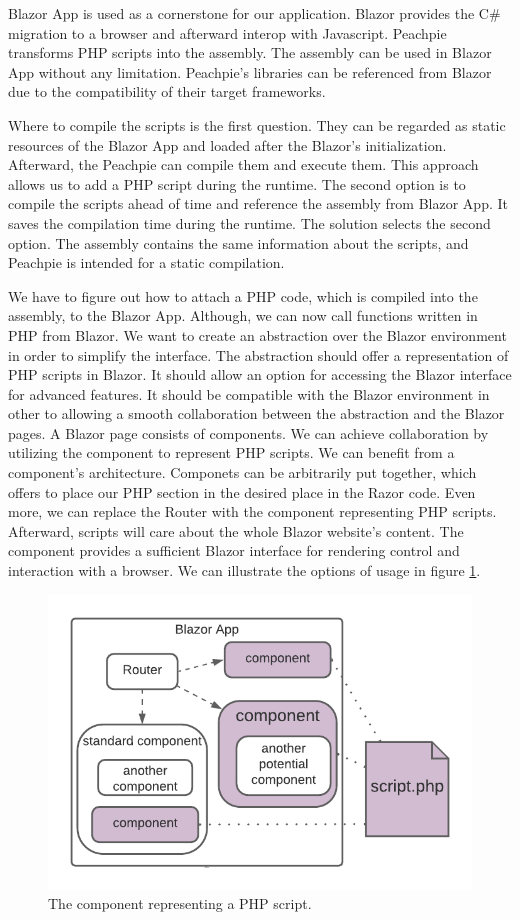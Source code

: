 Blazor App is used as a cornerstone for our application.
Blazor provides the C\# migration to a browser and afterward interop with Javascript.
Peachpie transforms PHP scripts into the assembly.
The assembly can be used in Blazor App without any limitation.
Peachpie's libraries can be referenced from Blazor due to the compatibility of their target frameworks.
\par
Where to compile the scripts is the first question.
They can be regarded as static resources of the Blazor App and loaded after the Blazor's initialization.
Afterward, the Peachpie can compile them and execute them.
This approach allows us to add a PHP script during the runtime.
The second option is to compile the scripts ahead of time and reference the assembly from Blazor App.
It saves the compilation time during the runtime.
The solution selects the second option.
The assembly contains the same information about the scripts, and Peachpie is intended for a static compilation.
\par
We have to figure out how to attach a PHP code, which is compiled into the assembly, to the Blazor App.
Although, we can now call functions written in PHP from Blazor.
We want to create an abstraction over the Blazor environment in order to simplify the interface.
The abstraction should offer a representation of PHP scripts in Blazor.
It should allow an option for accessing the Blazor interface for advanced features.
It should be compatible with the Blazor environment in other to allowing a smooth collaboration between the abstraction and the Blazor pages.
A Blazor page consists of components.
We can achieve collaboration by utilizing the component to represent PHP scripts.
We can benefit from a component's architecture.
Componets can be arbitrarily put together, which offers to place our PHP section in the desired place in the Razor code.
Even more, we can replace the Router with the component representing PHP scripts.
Afterward, scripts will care about the whole Blazor website's content.
The component provides a sufficient Blazor interface for rendering control and interaction with a browser. 
We can illustrate the options of usage in figure \ref{img02:component}.
\par
\begin{figure}[H]\centering
\includegraphics{./img/component}
\caption{The component representing a PHP script.}
\label{img02:component}
\end{figure} 
